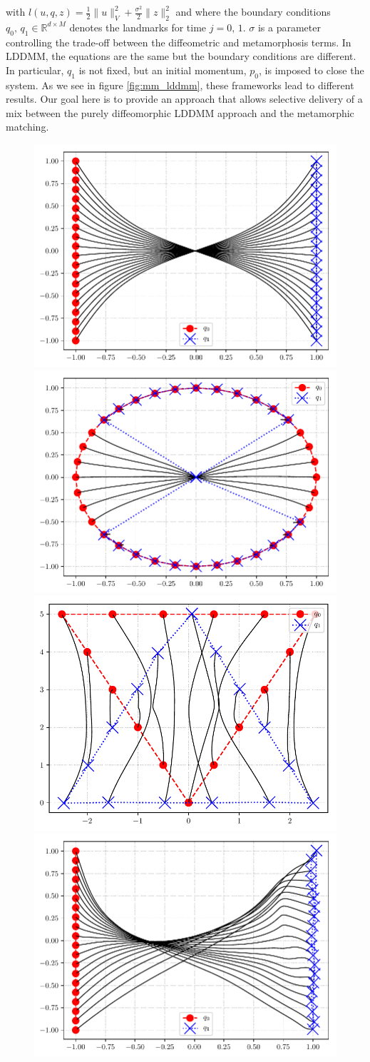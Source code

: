 \documentclass[runningheads]{llncs}
\newcommand{\half}{\frac 12}
\newcommand{\norm}[2]{\| #1 \|_{ #2 }}
\newcommand{\vnorm}[1]{\norm{ #1 }{V}}
\newcommand{\ltwonorm}[1]{\norm{ #1 }{2}}
\newcommand{\RdM}{\mathbb{R}^{d\times M}}
\begin{document}
with $l(u, q, z) = \half \vnorm{u}^2 + \frac{\sigma^2}2 \ltwonorm{z}^2$ and
where the boundary conditions $q_0,\,q_1 \in \RdM$ denotes the landmarks for
time $j=0,\,1$.  $\sigma$ is a parameter controlling the trade-off between the
diffeometric and metamorphosis terms. In LDDMM, the equations are the same but
the boundary conditions are different.  In particular, $q_1$ is not fixed, but
an initial momentum, $p_0$, is imposed to close the system. As we see in figure
\ref{fig:mm_lddmm}, these frameworks lead to different results. Our goal here is
to provide an approach that allows selective delivery of a mix between the
purely diffeomorphic LDDMM approach and the metamorphic matching.

\begin{figure}
\centering
\begin{minipage}{\textwidth}
  \centering
    \includegraphics[width=.3\textwidth]{mm_criss_cross.pdf}\quad
    \includegraphics[width=.3\textwidth]{mm_squeeze.pdf}\quad
    \includegraphics[width=.3\textwidth]{mm_triangle_flip.pdf}\\[0.25cm]
    \includegraphics[width=.3\textwidth]{lddmm_criss_cross.pdf}\quad

\end{minipage}
\end{figure}
\end{document}
